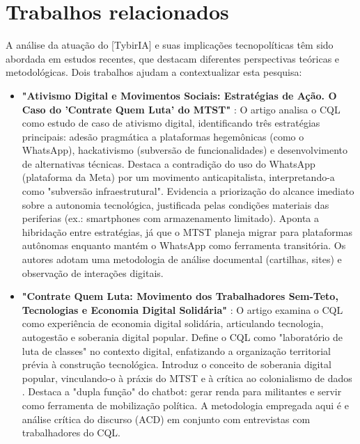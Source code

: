 \section{Trabalhos relacionados}
\label{sec:trabalhosrelacionados}

A análise da atuação do [TybirIA] e suas implicações tecnopolíticas têm sido abordada em estudos recentes, que destacam diferentes perspectivas teóricas e metodológicas. Dois trabalhos ajudam a contextualizar esta pesquisa:

\begin{itemize}
    \item \textbf{"Ativismo Digital e Movimentos Sociais: Estratégias de Ação. O Caso do 'Contrate Quem Luta' do MTST" } \cite{burity2024}:
    O artigo analisa o CQL como estudo de caso de ativismo digital, identificando três estratégias principais: adesão pragmática a plataformas hegemônicas (como o WhatsApp), hackativismo (subversão de funcionalidades) e desenvolvimento de alternativas técnicas. Destaca a contradição do uso do WhatsApp (plataforma da Meta) por um movimento anticapitalista, interpretando-a como "subversão infraestrutural". Evidencia a priorização do alcance imediato sobre a autonomia tecnológica, justificada pelas condições materiais das periferias (ex.: smartphones com armazenamento limitado).
    Aponta a hibridação entre estratégias, já que o MTST planeja migrar para plataformas autônomas enquanto mantém o WhatsApp como ferramenta transitória.
    Os autores adotam uma metodologia de análise documental (cartilhas, sites) e observação de interações digitais.
    
    \item \textbf{"Contrate Quem Luta: Movimento dos Trabalhadores Sem-Teto, Tecnologias e Economia Digital Solidária" } \cite{Silva2023}:
    O artigo examina o CQL como experiência de economia digital solidária, articulando tecnologia, autogestão e soberania digital popular. Define o CQL como "laboratório de luta de classes" no contexto digital, enfatizando a organização territorial prévia à construção tecnológica. Introduz o conceito de soberania digital popular, vinculando-o à práxis do MTST e à crítica ao colonialismo de dados . Destaca a "dupla função" do chatbot: gerar renda para militantes e servir como ferramenta de mobilização política. A metodologia empregada aqui é e análise crítica do discurso (ACD) em conjunto com entrevistas com trabalhadores do CQL.
\end{itemize}